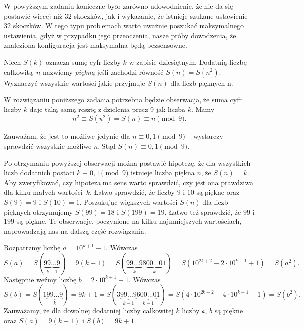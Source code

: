 \noindent
W powyższym zadaniu konieczne było zarówno udowodnienie, że nie da się postawić więcej niż $32$ skoczków, jak i wykazanie, że istnieje szukane ustawienie $32$ skoczków. W tego typu problemach warto uważnie poszukać maksymalnego ustawienia, gdyż w przypadku jego przeoczenia, nasze próby dowodzenia, że znaleziona konfiguracja jest maksymalna będą bezsensowne. 

\vspace{10px}


\noindent
Niech $S(k)$ oznacza sumę cyfr liczby $k$ w zapisie dziesiętnym. Dodatnią liczbę całkowitą~$n$ nazwiemy \textit{piękną} jeśli zachodzi równość $S(n) = S(n^2)$. Wyznaczyć wszystkie wartości jakie przyjmuje $S(n)$ dla liczb pięknych n.

\newpage


\noindent
W rozwiązaniu poniższego zadania potrzebna będzie obserwacja, że suma cyfr liczby $k$ daje taką samą resztę z dzielenia przez $9$ jak liczba $k$. Mamy
\[
    n^2 \equiv S(n^2) = S(n) \equiv n \pmod{9}.
\]

\noindent
Zauważam, że jest to możliwe jedynie dla $n \equiv 0, 1 \pmod{9}$ -- wystarczy sprawdzić wszystkie możliwe $n$. Stąd $S(n) \equiv 0, 1 \pmod{9}$.

\vspace{5px}

\noindent
Po otrzymaniu powyższej obserwacji można postawić hipotezę, że dla wszystkich liczb dodatnich postaci $k \equiv 0, 1 \pmod{9}$ istnieje liczba piękna $n$, że $S(n) = k$. Aby zweryfikować, czy hipoteza ma sens warto sprawdzić, czy jest ona prawdziwa dla kilku małych wartości~$k$. Łatwo sprawdzić, że liczby $9$ i $10$ są piękne oraz $S(9) = 9$ i $S(10) = 1$. Poszukując większych wartości $S(n)$ dla liczb pięknych otrzymujemy $S(99) = 18$ i ${S(199) = 19}$. Łatwo też sprawdzić, że $99$ i $199$ są piękne. Te obserwacje, poczynione na kilku najmniejszych wartościach, naprowadzają nas na dalszą część rozwiązania.

\vspace{5px}

\noindent
Rozpatrzmy liczbę $a = 10^{k + 1} - 1$. Wówczas
\[
    S(a) = S(\underbrace{99...9}_{k+1}) = 9(k + 1) = S(\underbrace{99...9}_{k}8\underbrace{00...0}_{k}1) = S(10^{2k + 2} - 2\cdot 10^{k + 1} + 1) = S(a^2).
\]
Następnie weźmy liczbę $b = 2 \cdot 10^{k + 1} - 1$. Wówczas
\[
    S(b) = S(1\underbrace{99...9}_{k}) = 9k + 1 = S(3\underbrace{99...9}_{k-1}6\underbrace{00...0}_{k-1}1) = S(4\cdot 10^{2k + 2} - 4\cdot 10^{k + 1} + 1) = S(b^2).
\]
Zauważamy, że dla dowolnej dodatniej liczby całkowitej $k$ liczby $a$, $b$ są piękne oraz ${S(a) = 9(k + 1)}$ i $S(b) = 9k + 1$.


